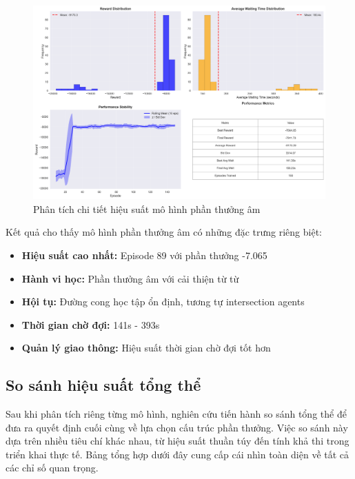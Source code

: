 \begin{figure}[!htp]
    \centering
    \includegraphics[width=\textwidth]{figures/sync_negative_model_summary.png}
    \caption{Phân tích chi tiết hiệu suất mô hình phần thưởng âm}
    \label{fig:sync_negative_model_summary}
\end{figure}

Kết quả cho thấy mô hình phần thưởng âm có những đặc trưng riêng biệt:
\begin{itemize}
    \item \textbf{Hiệu suất cao nhất:} Episode 89 với phần thưởng -7.065

    \item \textbf{Hành vi học:} Phần thưởng âm với cải thiện từ từ

    \item \textbf{Hội tụ:} Đường cong học tập ổn định, tương tự intersection agents

    \item \textbf{Thời gian chờ đợi:} 141s - 393s

    \item \textbf{Quản lý giao thông:} Hiệu suất thời gian chờ đợi tốt hơn
\end{itemize}

\subsection{So sánh hiệu suất tổng thể}
Sau khi phân tích riêng từng mô hình, nghiên cứu tiến hành so sánh tổng thể để đưa ra quyết định cuối cùng về lựa chọn cấu trúc phần thưởng. Việc so sánh này dựa trên nhiều tiêu chí khác nhau, từ hiệu suất thuần túy đến tính khả thi trong triển khai thực tế. Bảng tổng hợp dưới đây cung cấp cái nhìn toàn diện về tất cả các chỉ số quan trọng.

